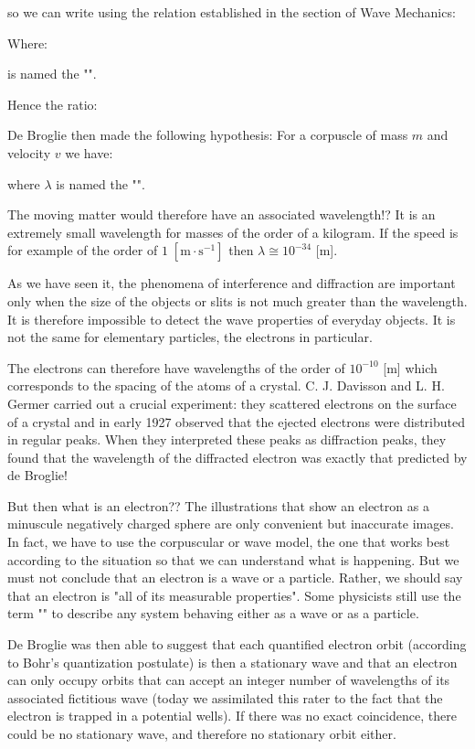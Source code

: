 	so we can write using the relation established in the section of Wave Mechanics:
	
	Where:
	
	is named the "\label{de Broglie relation}".
	
	Hence the ratio:
	
	De Broglie then made the following hypothesis: For a corpuscle of mass $m$ and velocity $v$ we have:
	
	where $\lambda$ is named the "".
	
	The moving matter would therefore have an associated wavelength!? It is an extremely small wavelength for masses of the order of a kilogram. If the speed is for example of the order of $1\;[\text{m}\cdot\text{s}^{-1}]$ then $\lambda\cong 10^{-34}$ [m].

	As we have seen it, the phenomena of interference and diffraction are important only when the size of the objects or slits is not much greater than the wavelength. It is therefore impossible to detect the wave properties of everyday objects. It is not the same for elementary particles, the electrons in particular.
	
	The electrons can therefore have wavelengths of the order of $10^{-10}$ [m] which corresponds to the spacing of the atoms of a crystal. C. J. Davisson and L. H. Germer carried out a crucial experiment: they scattered electrons on the surface of a crystal and in early 1927 observed that the ejected electrons were distributed in regular peaks. When they interpreted these peaks as diffraction peaks, they found that the wavelength of the diffracted electron was exactly that predicted by de Broglie!
	
	But then what is an electron?? The illustrations that show an electron as a minuscule negatively charged sphere are only convenient but inaccurate images. In fact, we have to use the corpuscular or wave model, the one that works best according to the situation so that we can understand what is happening. But we must not conclude that an electron is a wave or a particle. Rather, we should say that an electron is "all of its measurable properties". Some physicists still use the term "" to describe any system behaving either as a wave or as a particle.
	
	De Broglie was then able to suggest that each quantified electron orbit (according to Bohr's quantization postulate) is then a stationary wave and that an electron can only occupy orbits that can accept an integer number of wavelengths of its associated fictitious wave (today we assimilated this rater to the fact that the electron is trapped in a potential wells). If there was no exact coincidence, there could be no stationary wave, and therefore no stationary orbit either.
	
